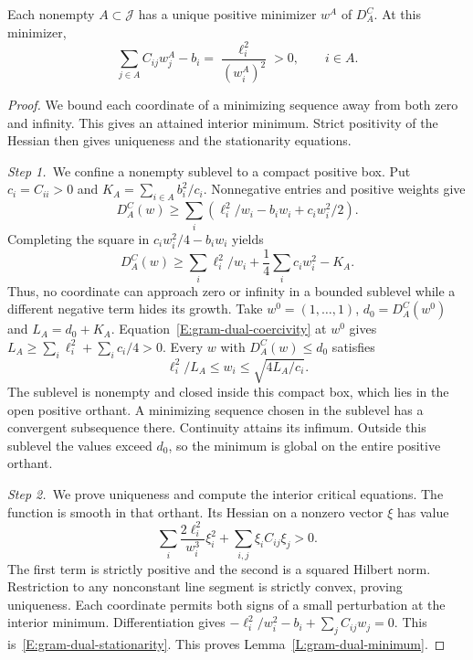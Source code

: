\begin{lemma}\label{L:gram-dual-minimum}
  Each nonempty $A \subset \mathcal{J}$ has a unique positive minimizer $w^A$ of
  $D_A^C$. At this minimizer,
  \begin{equation}\label{E:gram-dual-stationarity}
    \sum_{j\in A}C_{ij}w_j^A-b_i
    =\frac{\ell_i^2}{(w_i^A)^2}>0,\qquad i\in A.
  \end{equation}
\end{lemma}

\begin{proof}
  We bound each coordinate of a minimizing sequence away from both zero and
  infinity. This gives an attained interior minimum. Strict positivity of the
  Hessian then gives uniqueness and the stationarity equations.


  \medskip
  \noindent\textit{Step 1.~}We confine a nonempty sublevel to a compact
  positive box.
  Put $c_i = C_{ii} > 0$ and $K_A = \sum_{i\in A}b_i^2/c_i$. Nonnegative entries
  and positive weights give
  \[
    D_A^C(w)\ge
    \sum_i\left(\ell_i^2/w_i-b_iw_i+c_iw_i^2/2\right).
  \]
  Completing the square in $c_iw_i^2/4-b_iw_i$ yields
  \begin{equation}\label{E:gram-dual-coercivity}
    D_A^C(w)\ge
    \sum_i\ell_i^2/w_i+\frac14\sum_i c_iw_i^2-K_A.
  \end{equation}
  Thus, no coordinate can approach zero or infinity in a bounded sublevel while
  a different negative term hides its growth. Take $w^0 = (1,\ldots,1)$, $d_0 =
  D_A^C(w^0)$ and $L_A = d_0+K_A$. Equation~\eqref{E:gram-dual-coercivity} at
  $w^0$ gives $L_A \ge \sum_i\ell_i^2+\sum_i c_i/4 > 0$. Every $w$ with
  $D_A^C(w) \le d_0$ satisfies
  \[
    \ell_i^2/L_A\le w_i\le\sqrt{4L_A/c_i}.
  \]
  The sublevel is nonempty and closed inside this compact box, which lies in the
  open positive orthant. A minimizing sequence chosen in the sublevel has a
  convergent subsequence there. Continuity attains its infimum. Outside this
  sublevel the values exceed $d_0$, so the minimum is global on the entire
  positive orthant.


  \medskip
  \noindent\textit{Step 2.~}We prove uniqueness and compute the interior
  critical equations.
  The function is smooth in that orthant. Its Hessian on a nonzero vector $\xi$
  has value
  \[
    \sum_i\frac{2\ell_i^2}{w_i^3}\xi_i^2
    +\sum_{i,j}\xi_iC_{ij}\xi_j>0.
  \]
  The first term is strictly positive and the second is a squared Hilbert norm.
  Restriction to any nonconstant line segment is strictly convex, proving
  uniqueness. Each coordinate permits both signs of a small perturbation at the
  interior minimum. Differentiation gives $-\ell_i^2/w_i^2-b_i+\sum_jC_{ij}w_j =
  0$. This is~\eqref{E:gram-dual-stationarity}. This proves
  Lemma~\ref{L:gram-dual-minimum}.
\end{proof}

